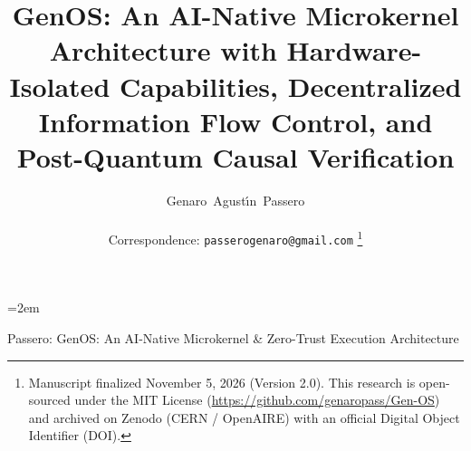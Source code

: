 \documentclass[10pt,journal,compsoc]{IEEEtran}
\theoremstyle{definition}
\begin{document}
\emergencystretch=2em

\title{GenOS: An AI-Native Microkernel Architecture with Hardware-Isolated Capabilities, Decentralized Information Flow Control, and Post-Quantum Causal Verification}

\author{Genaro~Agust\'{\i}n~Passero\\
\\
Correspondence: \texttt{passerogenaro@gmail.com}
\thanks{Manuscript finalized November 5, 2026 (Version 2.0). This research is open-sourced under the MIT License (\url{https://github.com/genaropass/Gen-OS}) and archived on Zenodo (CERN / OpenAIRE) with an official Digital Object Identifier (DOI).}}

%
{Passero: GenOS: An AI-Native Microkernel \& Zero-Trust Execution Architecture}
\end{document}
